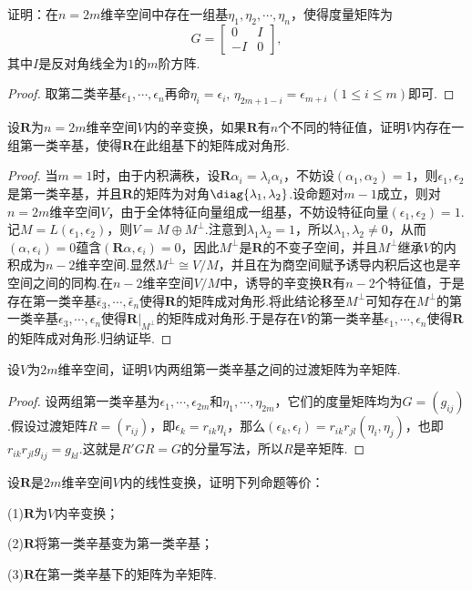 \begin{prob}[5]
	证明：在$n=2m$维辛空间中存在一组基$\eta_1,\eta_2,\cdots,\eta_n$，使得度量矩阵为
	\[
		G=\begin{bmatrix}
			0  & I \\
			-I & 0
		\end{bmatrix},
	\]
	其中$I$是反对角线全为$1$的$m$阶方阵.
\end{prob}
\begin{proof}
	取第二类辛基$\epsilon_1,\cdots,\epsilon_n$再命$\eta_i=\epsilon_i,\,\eta_{2m+1-i}=\epsilon_{m+i}\,(1\le i\le m)$即可.
\end{proof}
\begin{prob}[6]
	设$\bm R$为$n=2m$维辛空间$V$内的辛变换，如果$\bm R$有$n$个不同的特征值，证明$V$内存在一组第一类辛基，使得$\bm R$在此组基下的矩阵成对角形.
\end{prob}
\begin{proof}
	当$m=1$时，由于内积满秩，设$\bm R\alpha_i=\lambda_i\alpha_i$，不妨设$(\alpha_1,\alpha_2)=1$，则$\epsilon_1,\epsilon_2$是第一类辛基，并且$\bm R$的矩阵为对角$\diag{\lambda_1,\lambda_2}$.设命题对$m-1$成立，则对$n=2m$维辛空间$V$，由于全体特征向量组成一组基，不妨设特征向量$(\epsilon_1,\epsilon_2)=1$.记$M=L(\epsilon_1,\epsilon_2)$，则$V=M\oplus M^\perp$.注意到$\lambda_1\lambda_2=1$，所以$\lambda_1,\lambda_2\ne 0$，从而$(\alpha,\epsilon_i)=0$蕴含$(\bm R\alpha,\epsilon_i)=0$，因此$M^\perp$是$\bm R$的不变子空间，并且$M^\perp$继承$V$的内积成为$n-2$维辛空间.显然$M^\perp\cong V/M$，并且在为商空间赋予诱导内积后这也是辛空间之间的同构.在$n-2$维辛空间$V/M$中，诱导的辛变换$\bm R$有$n-2$个特征值，于是存在第一类辛基$\bar{\epsilon}_3,\cdots,\bar{\epsilon}_n$使得$\bm R$的矩阵成对角形.将此结论移至$M^\perp$可知存在$M^\perp$的第一类辛基$\epsilon_3,\cdots,\epsilon_n$使得$\bm R|_{M^\perp}$的矩阵成对角形.于是存在$V$的第一类辛基$\epsilon_1,\cdots,\epsilon_n$使得$\bm R$的矩阵成对角形.归纳证毕.
\end{proof}
\begin{prob}[7]
	设$V$为$2m$维辛空间，证明$V$内两组第一类辛基之间的过渡矩阵为辛矩阵.
\end{prob}
\begin{proof}
	设两组第一类辛基为$\epsilon_1,\cdots,\epsilon_{2m}$和$\eta_1,\cdots,\eta_{2m}$，它们的度量矩阵均为$G=(g_{ij})$.假设过渡矩阵$R=(r_{ij})$，即$\epsilon_k=r_{ik}\eta_i$，那么$(\epsilon_k,\epsilon_l)=r_{ik}r_{jl}(\eta_i,\eta_j)$，也即$r_{ik}r_{jl}g_{ij}=g_{kl}$.这就是$R'GR=G$的分量写法，所以$R$是辛矩阵.
\end{proof}
\begin{prob}[8]
	设$\bm R$是$2m$维辛空间$V$内的线性变换，证明下列命题等价：

	(1)$\bm R$为$V$内辛变换；

	(2)$\bm R$将第一类辛基变为第一类辛基；

	(3)$\bm R$在第一类辛基下的矩阵为辛矩阵.
\end{prob}

